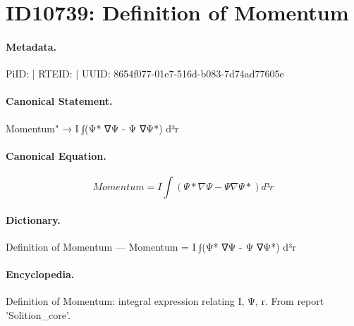 \section*{ID10739: Definition of Momentum}
\paragraph{Metadata.}
PiID:  | RTEID:  | UUID: 8654f077-01e7-516d-b083-7d74ad77605e

\paragraph{Canonical Statement.}
Momentum" → I ∫(Ψ* ∇Ψ - Ψ ∇Ψ*) d³r

\paragraph{Canonical Equation.}
\[
Momentum = I ∫(Ψ* ∇Ψ - Ψ ∇Ψ*) d³r
\]

\paragraph{Dictionary.}
Definition of Momentum — Momentum = I ∫(Ψ* ∇Ψ - Ψ ∇Ψ*) d³r

\paragraph{Encyclopedia.}
Definition of Momentum: integral expression relating I, Ψ, r. From report 'Solition\_core'.
